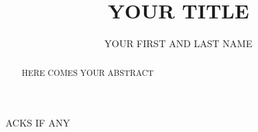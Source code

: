 \documentclass{utitcmsc}
\title{YOUR TITLE}
\author{YOUR FIRST AND LAST NAME}
\begin{document}
\maketitle
\frontmatter

\begin{abstract}
HERE COMES YOUR ABSTRACT
\end{abstract}

\begin{acknowledgements}
ACKS IF ANY
\end{acknowledgements}
\tableofcontents
\listoffigures
\listoftables


\mainmatter






\backmatter




\end{document}
